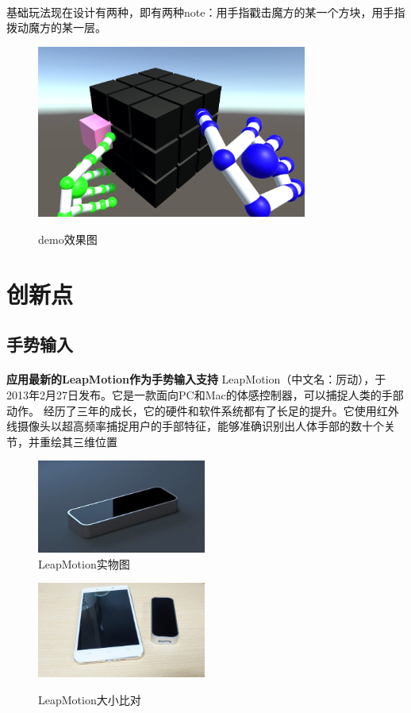 \documentclass{article}
\begin{document}
\paragraph{}
基础玩法现在设计有两种，即有两种note：用手指戳击魔方的某一个方块，用手指拨动魔方的某一层。
\begin{figure}[H]
  \centering
  \includegraphics[width=24em]{demo.png}\\
  \caption{demo效果图}\label{4-1}
\end{figure}
\newpage
\section{创新点}
\subsection{手势输入}
\paragraph{}
\textbf{应用最新的LeapMotion作为手势输入支持}
LeapMotion（中文名：厉动），于2013年2月27日发布。它是一款面向PC和Mac的体感控制器，可以捕捉人类的手部动作。
经历了三年的成长，它的硬件和软件系统都有了长足的提升。它使用红外线摄像头以超高频率捕捉用户的手部特征，能够准确识别出人体手部的数十个关节，并重绘其三维位置
\begin{figure}[H]
\begin{minipage}{0.5\linewidth}
  \includegraphics[width=15em]{leap.png}\\
  \caption{LeapMotion实物图}\label{3-1}
\end{minipage}
\begin{minipage}{0.5\linewidth}
  \includegraphics[width=15em]{leapCompare.png}\\
  \caption{LeapMotion大小比对}\label{3-2}
\end{minipage}
\end{figure}
\end{document}
